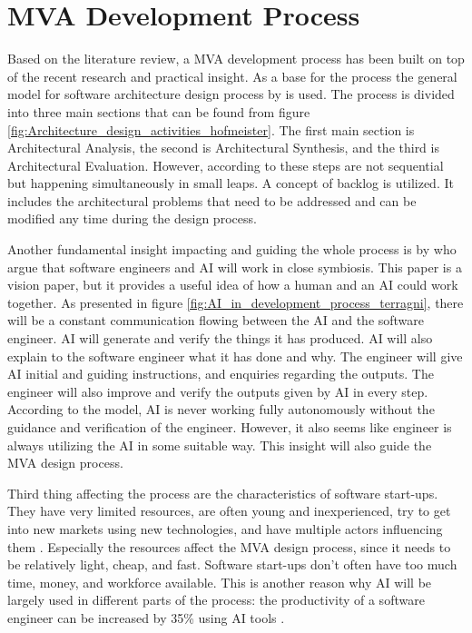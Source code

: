 \section{MVA Development Process}

Based on the literature review, a MVA development process has been built on top of the recent research and practical insight. As a base for the process the general model for software architecture design process by \textcite{hofmeisterGeneralModelSoftware2007} is used. The process is divided into three main sections that can be found from figure \ref{fig:Architecture_design_activities_hofmeister}. The first main section is Architectural Analysis, the second is Architectural Synthesis, and the third is Architectural Evaluation. However, according to \citeauthor{hofmeisterGeneralModelSoftware2007} these steps are not sequential but happening simultaneously in small leaps. A concept of backlog is utilized. It includes the architectural problems that need to be addressed and can be modified any time during the design process.

Another fundamental insight impacting and guiding the whole process is by \textcite{terragniFutureAIDrivenSoftware2025} who argue that software engineers and AI will work in close symbiosis. This paper is a vision paper, but it provides a useful idea of how a human and an AI could work together. As presented in figure \ref{fig:AI_in_development_process_terragni}, there will be a constant communication flowing between the AI and the software engineer. AI will generate and verify the things it has produced. AI will also explain to the software engineer what it has done and why. The engineer will give AI initial and guiding instructions, and enquiries regarding the outputs. The engineer will also improve and verify the outputs given by AI in every step. According to the model, AI is never working fully autonomously without the guidance and verification of the engineer. However, it also seems like engineer is always utilizing the AI in some suitable way. This insight will also guide the MVA design process.

Third thing affecting the process are the characteristics of software start-ups. They have very limited resources, are often young and inexperienced, try to get into new markets using new technologies, and have multiple actors influencing them \parencite{suttonRoleProcessSoftwareJuly-Aug./2000}. Especially the resources affect the MVA design process, since it needs to be relatively light, cheap, and fast. Software start-ups don't often have too much time, money, and workforce available. This is another reason why AI will be largely used in different parts of the process: the productivity of a software engineer can be increased by 35\% using AI tools \parencite{amasantiImpactAIGeneratedSolutions2026}.

